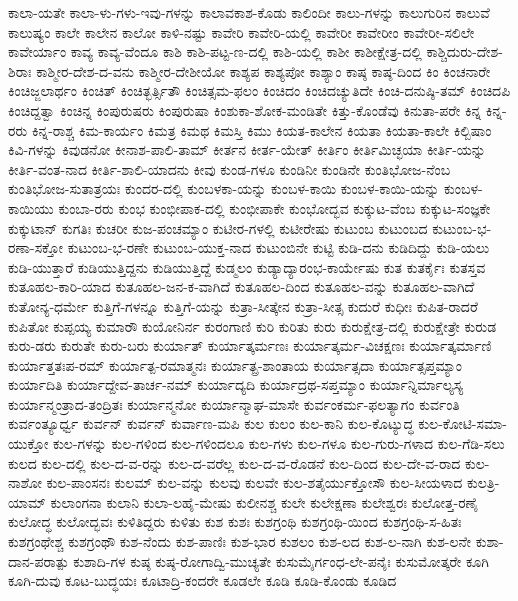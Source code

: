 {ಕಾಲಾ-ಯತೇ
ಕಾಲಾ-ಳು-ಗಳು-ಇವು-ಗಳನ್ನು
ಕಾಲಾವಕಾಶ-ಕೊಡು
ಕಾಲಿಂದೀ
ಕಾಲು-ಗಳನ್ನು
ಕಾಲುಗುರಿನ
ಕಾಲುವೆ
ಕಾಲುಷ್ಯಂ
ಕಾಲೇ
ಕಾಲೇನ
ಕಾಲೋ
ಕಾಳಿ-ನಷ್ಟು
ಕಾವೇರಿ
ಕಾವೇರಿ-ಯಲ್ಲಿ
ಕಾವೇರೀ
ಕಾವೇರೀಂ
ಕಾವೇರೀ-ಸಲಿಲೇ
ಕಾವೇರ್ಯಾಂ
ಕಾವ್ಯ
ಕಾವ್ಯ-ವೆಂದೂ
ಕಾಶಿ
ಕಾಶಿ-ಪಟ್ಟ-ಣ-ದಲ್ಲಿ
ಕಾಶಿ-ಯಲ್ಲಿ
ಕಾಶೀ
ಕಾಶೀಕ್ಷೇತ್ರ-ದಲ್ಲಿ
ಕಾಶ್ಚಿದುರು-ದೇಶ-ಶಿರಾಃ
ಕಾಶ್ಮೀರ-ದೇಶ-ದ-ವನು
ಕಾಶ್ಮೀರ-ದೇಶೀಯೋ
ಕಾಶ್ಯಪ
ಕಾಶ್ಯಪೋ
ಕಾಶ್ಯಾಂ
ಕಾಷ್ಠ
ಕಾಷ್ಠ-ದಿಂದ
ಕಿಂ
ಕಿಂಚನಾರೇ
ಕಿಂಚಿಜ್ಜಲಾರ್ಥಂ
ಕಿಂಚಿತ್
ಕಿಂಚಿತ್ಭರ್ತ್ಸಿತೌ
ಕಿಂಚಿತ್ಸಮ-ಫಲಂ
ಕಿಂಚಿದಂ
ಕಿಂಚಿದಚ್ಯುತಿದೇ
ಕಿಂಚಿ-ದನುಷ್ಠಿ-ತಮ್
ಕಿಂಚಿದಪಿ
ಕಿಂಚಿದ್ದತ್ವಾ
ಕಿಂಚಿನ್ನ
ಕಿಂಪುರುಷರು
ಕಿಂಪುರುಷಾ
ಕಿಂಶುಕಾ-ಶೋಕ-ಮಂಡಿತೇ
ಕಿತ್ತು-ಕೊಂಡೆವು
ಕಿನುತಾ-ಪರೇ
ಕಿನ್ನ
ಕಿನ್ನ-ರರು
ಕಿನ್ನ-ರಾಶ್ಚ
ಕಿಮ-ಕಾರ್ಯಂ
ಕಿಮತ್ರ
ಕಿಮಥ
ಕಿಮಸ್ತಿ
ಕಿಮು
ಕಿಯತ-ಕಾಲೇನ
ಕಿಯತಾ
ಕಿಯತಾ-ಕಾಲೇ
ಕಿಲ್ಬಿಷಾಂ
ಕಿವಿ-ಗಳನ್ನು
ಕಿವುಡನೋ
ಕೀನಾಶ-ಪಾಲಿ-ತಾಮ್
ಕೀರ್ತನ
ಕೀರ್ತ-ಯೇತ್
ಕೀರ್ತಿಂ
ಕೀರ್ತಿಮಿಚ್ಛಯಾ
ಕೀರ್ತಿ-ಯನ್ನು
ಕೀರ್ತಿ-ವಂತ-ನಾದ
ಕೀರ್ತಿ-ಶಾಲಿ-ಯಾದನು
ಕೀವು
ಕುಂಡ-ಗಳೂ
ಕುಂಡಿನೀ
ಕುಂಡಿನೇ
ಕುಂತಿಭೋಜ-ನೆಂಬ
ಕುಂತಿಭೋಜ-ಸುತಾತ್ರಯಃ
ಕುಂದರ-ದಲ್ಲಿ
ಕುಂಬಳಕಾ-ಯನ್ನು
ಕುಂಬಳ-ಕಾಯಿ
ಕುಂಬಳ-ಕಾಯಿ-ಯನ್ನು
ಕುಂಬಳ-ಕಾಯಿಯು
ಕುಂಬಾ-ರರು
ಕುಂಭ
ಕುಂಭೀಪಾಕ-ದಲ್ಲಿ
ಕುಂಭೀಪಾಕೇ
ಕುಂಭೋದ್ಭವ
ಕುಕ್ಕುಟ-ವೆಂಬ
ಕುಕ್ಕುಟ-ಸಂಜ್ಞಕೇ
ಕುಕ್ಕುಟಾನ್
ಕುಗತಿಃ
ಕುಚರೀ
ಕುಜ-ಪಂಚಮ್ಯಾಂ
ಕುಟೀರ-ಗಳಲ್ಲಿ
ಕುಟೀರೇಷು
ಕುಟುಂಬ
ಕುಟುಂಬದ
ಕುಟುಂಬ-ಭ-ರಣಾ-ಸಕ್ತೋ
ಕುಟುಂಬ-ಭ-ರಣೇ
ಕುಟುಂಬ-ಯುಕ್ತ-ನಾದ
ಕುಟುಂಬಿನೇ
ಕುಟ್ಟಿ
ಕುಡಿ-ದನು
ಕುಡಿದಿದ್ದು
ಕುಡಿ-ಯಲು
ಕುಡಿ-ಯುತ್ತಾರೆ
ಕುಡಿಯುತ್ತಿದ್ದನು
ಕುಡಿಯುತ್ತಿದ್ದೆ
ಕುಡ್ಮಲಂ
ಕುಡ್ಯಾದ್ಯಾರಂಭ-ಕಾರ್ಯೇಷು
ಕುತ
ಕುತರ್ಕೈಃ
ಕುತಸ್ತವ
ಕುತೂಹಲ-ಕಾರಿ-ಯಾದ
ಕುತೂಹಲ-ಜನ-ಕ-ವಾಗಿದೆ
ಕುತೂಹಲ-ದಿಂದ
ಕುತೂಹಲ-ವನ್ನು
ಕುತೂಹಲ-ವಾಗಿದೆ
ಕುತೋನ್ಯ-ಧರ್ಮೇ
ಕುತ್ತಿಗೆ-ಗಳನ್ನೂ
ಕುತ್ತಿಗೆ-ಯನ್ನು
ಕುತ್ರಾ-ಸೀತ್ಕೇನ
ಕುತ್ರಾ-ಸೀತ್ಸ
ಕುದುರೆ
ಕುಧೀಃ
ಕುಪಿತ-ರಾದರೆ
ಕುಪಿತೋ
ಕುಪ್ಪಯ್ಯ
ಕುಮಾರೌ
ಕುಯೋನಿರ್ನ
ಕುರಂಗಾಣಿ
ಕುರಿ
ಕುರಿತು
ಕುರು
ಕುರುಕ್ಷೇತ್ರ-ದಲ್ಲಿ
ಕುರುಕ್ಷೇತ್ರೇ
ಕುರುಡ
ಕುರು-ಡರು
ಕುರುತೇ
ಕುರು-ಬರು
ಕುರ್ಯಾತ್
ಕುರ್ಯಾತ್ಕರ್ಮಣಃ
ಕುರ್ಯಾತ್ಕರ್ಮ-ವಿಚಕ್ಷಣಃ
ಕುರ್ಯಾತ್ಕರ್ಮಾಣಿ
ಕುರ್ಯಾತ್ತತಃಪ-ರಮ್
ಕುರ್ಯಾತ್ಪ-ರಮಾತ್ಮನಃ
ಕುರ್ಯಾತ್ಪ್ರ-ಶಾಂತಾಯ
ಕುರ್ಯಾತ್ಸದಾ
ಕುರ್ಯಾತ್ಸಪ್ತಮ್ಯಾಂ
ಕುರ್ಯಾದಿತಿ
ಕುರ್ಯಾದ್ದೇವ-ತಾರ್ಚ-ನಮ್
ಕುರ್ಯಾದ್ಯದಿ
ಕುರ್ಯಾದ್ರಥ-ಸಪ್ತಮ್ಯಾಂ
ಕುರ್ಯಾನ್ನಿರ್ಮಾಲ್ಯಸ್ಯ
ಕುರ್ಯಾನ್ಮಂತ್ರಾದ-ತಂದ್ರಿತಃ
ಕುರ್ಯಾನ್ಮನೋ
ಕುರ್ಯಾನ್ಮಾಘ-ಮಾಸೇ
ಕುರ್ವಂಕರ್ಮ-ಫಲತ್ಯಾಗಂ
ಕುರ್ವಂತಿ
ಕುರ್ವಂತ್ಯೂರ್ಧ್ವ
ಕುರ್ವನ್
ಕುರ್ವನ್
ಕುರ್ವಾಣ-ಮಪಿ
ಕುಲ
ಕುಲಂ
ಕುಲ-ಕಾನಿ
ಕುಲ-ಕೊಟ್ಯುದ್ಧ
ಕುಲ-ಕೋಟಿ-ಸಮಾ-ಯುಕ್ತೋ
ಕುಲ-ಗಳನ್ನು
ಕುಲ-ಗಳಿಂದ
ಕುಲ-ಗಳಿಂದಲೂ
ಕುಲ-ಗಳು
ಕುಲ-ಗಳೂ
ಕುಲ-ಗುರು-ಗಳಾದ
ಕುಲ-ಗೆಡಿ-ಸಲು
ಕುಲದ
ಕುಲ-ದಲ್ಲಿ
ಕುಲ-ದ-ವ-ರನ್ನು
ಕುಲ-ದ-ವರೆಲ್ಲ
ಕುಲ-ದ-ವ-ರೊಡನೆ
ಕುಲ-ದಿಂದ
ಕುಲ-ದೇ-ವ-ರಾದ
ಕುಲ-ನಾಶೋ
ಕುಲ-ಪಾಂಸನಃ
ಕುಲಮ್
ಕುಲ-ವನ್ನು
ಕುಲವು
ಕುಲವೇ
ಕುಲ-ಶತೈರ್ಯುಕ್ತೋಸೌ
ಕುಲ-ಸೀಯಳಾದ
ಕುಲತ್ರಿ-ಯಾಮ್
ಕುಲಾಂಗನಾ
ಕುಲಾನಿ
ಕುಲಾ-ಲಹೈ-ಮೇಷು
ಕುಲೀನಶ್ಚ
ಕುಲೇ
ಕುಲೇಕ್ಷಣಾ
ಕುಲೇಶ್ವರಃ
ಕುಲೋತ್ತ-ರಣೈ
ಕುಲೋದ್ಧ
ಕುಲೋದ್ಭವಃ
ಕುಳಿತಿದ್ದರು
ಕುಳಿತು
ಕುಶ
ಕುಶಃ
ಕುಶಗ್ರಂಥಿ
ಕುಶಗ್ರಂಥಿ-ಯಿಂದ
ಕುಶಗ್ರಂಥಿ-ಸ-ಹಿತಃ
ಕುಶಗ್ರಂಥೇಶ್ಚ
ಕುಶಗ್ರಂಥೌ
ಕುಶ-ನೆಂದು
ಕುಶ-ಪಾಣಿಃ
ಕುಶ-ಭಾರ
ಕುಶಲಂ
ಕುಶ-ಲದ
ಕುಶ-ಲ-ನಾಗಿ
ಕುಶ-ಲನೇ
ಕುಶಾ-ದಾನ-ಪರಾತ್ಪು
ಕುಶಾದಿ-ಗಳ
ಕುಷ್ಠ
ಕುಷ್ಠ-ರೋಗಾದ್ವಿ-ಮುಚ್ಯತೇ
ಕುಸುಮೈರ್ಗಂಧ-ಲೇ-ಪನೈಃ
ಕುಸುಮೋತ್ಕರೇ
ಕೂಗಿ
ಕೂಗಿ-ದುವು
ಕೂಟ-ಬುದ್ಧಯಃ
ಕೂಟಾದ್ರಿ-ಕಂದರೇ
ಕೂಡಲೇ
ಕೂಡಿ
ಕೂಡಿ-ಕೊಂಡು
ಕೂಡಿದ
}
